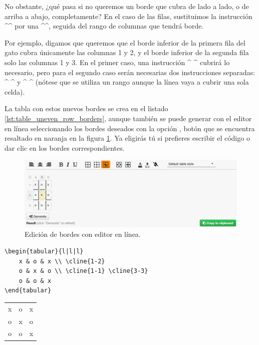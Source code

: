 No obstante, ¿qué pasa si no queremos un borde que cubra de lado a lado, o de arriba a abajo, completamente? En el caso de las filas, sustituimos la instrucción ^\hline^ por una ^\cline^, seguida del rango de columnas que tendrá borde.

Por ejemplo, digamos que queremos que el borde inferior de la primera fila del gato cubra únicamente las columnas 1 y 2, y el borde inferior de la segunda fila solo las columnas 1 y 3. En el primer caso, una instrucción ^^ cubrirá lo necesario, pero para el segundo caso serán necesarias dos instrucciones separadas: ^^ y ^^ (nótese que se utiliza un rango aunque la línea vaya a cubrir una sola celda).

La tabla con estos nuevos bordes se crea en el listado \ref{lst:table_uneven_row_borders}, aunque también se puede generar con el editor en línea seleccionando los bordes deseados con la opción , botón que se encuentra resaltado en naranja en la figura \ref{fig:table_borders}. Ya eligirás tú si prefieres escribir el código o dar clic en los bordes correspondientes.

\begin{figure}[ht!]
	\centering
	\includegraphics[width=\linewidth]{img/table_borders_300ppi.png}
	\caption{Edición de bordes con editor en línea.}
	\label{fig:table_borders}
\end{figure}

\noindent \begin{minipage}[ht!]{.80\linewidth}
\begin{lstlisting}[style=latex,frame={},caption={Código de tabla con bordes incompletos para filas.},label=lst:table_uneven_row_borders]
\begin{tabular}{l|l|l}
	x & o & x \\ \cline{1-2}
	o & x & o \\ \cline{1-1} \cline{3-3}
	o & o & x
\end{tabular}
\end{lstlisting}
\end{minipage}
\begin{minipage}[ht!]{.19\linewidth}
\begin{center}
	\vspace{-0.7cm}
	\begin{tabular}{l|l|l}
		x & o & x \\ \cline{1-2}
		o & x & o \\ \cline{1-1} \cline{3-3} 
		o & o & x
	\end{tabular}
\end{center}
\end{minipage}

